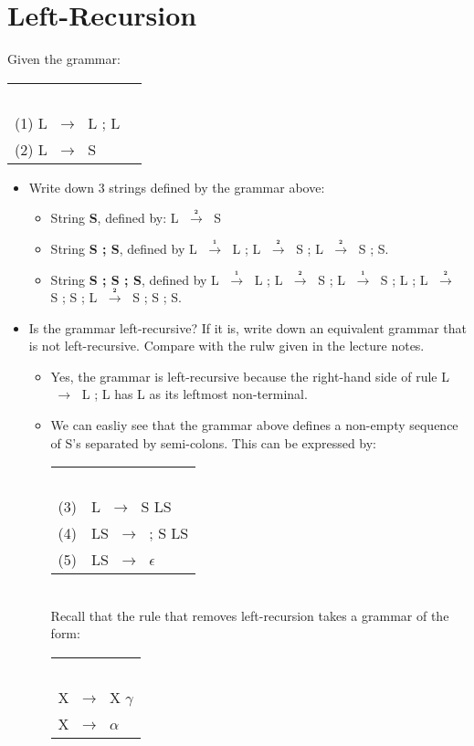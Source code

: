 \documentclass{article}
\newcommand{\regla}[1]{$\;\mathbf{\stackrel{{}_{#1}}{\longrightarrow}}\;$}
\begin{document}
\section{Left-Recursion}

Given the grammar:

\begin{tabular}{ll}
\ \\
(1) L  \regla{}  L ; L \\
(2) L  \regla{} S \\
\end{tabular}

\begin{itemize}
\item Write down 3 strings defined by the grammar above:
\begin{itemize}
\item String \textbf{S}, defined by: L \regla{2} S
\item String \textbf{S ; S}, defined by L \regla{1} L ; L \regla{2} S ; L \regla{2} S ; S.
\item String \textbf{S ; S ; S}, defined by L \regla{1} L ; L \regla{2} S ; L \regla{1} S ; L ; L \regla{2} S ; S ; L \regla{2} S ; S ; S.

\end{itemize}

\item Is the grammar left-recursive? If it is, write down an equivalent grammar that is not left-recursive. Compare with the rulw given  in the lecture notes.
\begin{itemize}
\item Yes, the grammar is left-recursive because the right-hand side of rule L \regla{} L ; L has L as its leftmost non-terminal.
\item We can easliy see that the grammar above defines a non-empty sequence of S's separated by semi-colons. This can be expressed by:

\begin{tabular}{ll}
\ \\
(3)  & L  \regla{}  S  LS\\
(4)  & LS  \regla{} ; S LS \\
(5)  & LS  \regla{} $\epsilon$ \\
\end{tabular} \\

Recall that the rule that removes left-recursion takes a grammar of the form:

\begin{tabular}{l}
\ \\
X  \regla{}  X $\gamma$ \\
X  \regla{} $\alpha$ \\
\end{tabular}


\end{itemize}
\end{itemize}
\end{document}
